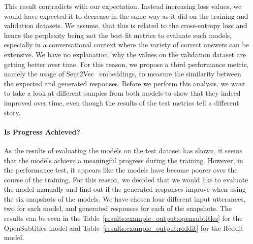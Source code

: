 This result contradicts with our expectation. Instead increasing loss values, we would have expected it to decrease in the same way as it did on the training and validation datasets. We assume, that this is related to the cross-entropy loss and hence the perplexity being not the best fit metrics to evaluate such models, especially in a conversational context where the variety of correct answers can be extensive. We have no explanation, why the values on the validation dataset are getting better over time. For this reason, we propose a third performance metric, namely the usage of Sent2Vec~\cite{Pgj:2017} embeddings, to measure the similarity between the expected and generated responses. Before we perform this analysis, we want to take a look at different samples from both models to show that they indeed improved over time, even though the results of the test metrics tell a different story.

\paragraph{Is Progress Achieved?} As the results of evaluating the models on the test dataset has shown, it seems that the models achieve a meaningful progress during the training. However, in the performance test, it appears like the models have become poorer over the course of the training. For this reason, we decided that we would like to evaluate the model manually and find out if the generated responses improve when using the six snapshots of the models. We have chosen four different input utterances, two for each model, and generated responses for each of the snapshots. The results can be seen in the Table~\ref{results:example_output:opensubtitles} for the OpenSubtitles model and Table~\ref{results:example_output:reddit} for the Reddit model.

